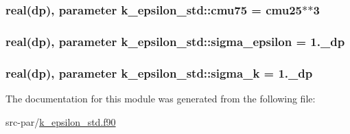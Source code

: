 \hypertarget{classk__epsilon__std_a385af61636cbfd6cd867898d54c297f1}{
\subsubsection[{cmu75}]{\setlength{\rightskip}{0pt plus 5cm}real(dp), parameter k\-\_\-epsilon\-\_\-std\-::cmu75 = {\bf cmu25}$\ast$$\ast$3}}\label{classk__epsilon__std_a385af61636cbfd6cd867898d54c297f1}
\hypertarget{classk__epsilon__std_a915f88270b38c6960c564a1e62b30a4b}{
\subsubsection[{sigma\-\_\-epsilon}]{\setlength{\rightskip}{0pt plus 5cm}real(dp), parameter k\-\_\-epsilon\-\_\-std\-::sigma\-\_\-epsilon = 1.\-\_\-dp}}\label{classk__epsilon__std_a915f88270b38c6960c564a1e62b30a4b}
\hypertarget{classk__epsilon__std_a6fa05e7c5d25ef3f137a8fbf3523f86e}{
\subsubsection[{sigma\-\_\-k}]{\setlength{\rightskip}{0pt plus 5cm}real(dp), parameter k\-\_\-epsilon\-\_\-std\-::sigma\-\_\-k = 1.\-\_\-dp}}\label{classk__epsilon__std_a6fa05e7c5d25ef3f137a8fbf3523f86e}


The documentation for this module was generated from the following file\-:\begin{DoxyCompactItemize}
\item 
src-\/par/\hyperlink{k__epsilon__std_8f90}{k\-\_\-epsilon\-\_\-std.\-f90}\end{DoxyCompactItemize}

